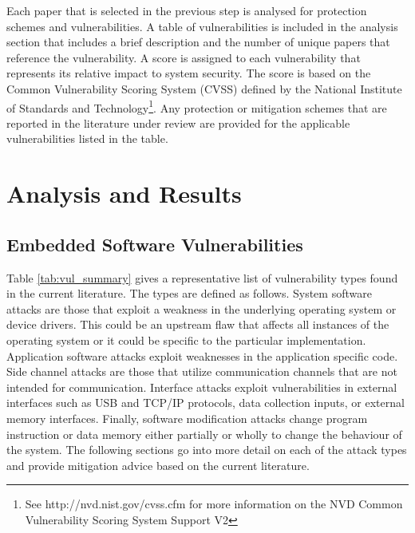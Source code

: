 \documentclass[final,conference,11pt]{IEEEtran}
\begin{document}
Each paper that is selected in the previous step is analysed for protection schemes and vulnerabilities.  A table of vulnerabilities is included in the analysis section that includes a brief description and the number of unique papers that reference the vulnerability. A score is assigned to each vulnerability that represents its relative impact to system security. The score is based on the Common Vulnerability Scoring System (CVSS) defined by the National Institute of Standards and Technology\footnote{See http://nvd.nist.gov/cvss.cfm for more information on the NVD Common Vulnerability Scoring System Support V2}.  Any protection or mitigation schemes that are reported in the literature under review are provided for the applicable vulnerabilities listed in the table.  

\section{Analysis and Results}

\subsection{Embedded Software Vulnerabilities}

Table \ref{tab:vul_summary} gives a representative list of vulnerability types found in the current literature.  The types are defined as follows.  System software attacks are those that exploit a weakness in the underlying operating system or device drivers.  This could be an upstream flaw that affects all instances of the operating system or it could be specific to the particular implementation. Application software attacks exploit weaknesses in the application specific code.  Side channel attacks are those that utilize communication channels that are not intended for communication.  Interface attacks exploit vulnerabilities in external interfaces such as USB and TCP/IP protocols, data collection inputs, or external memory interfaces.  Finally, software modification attacks change program instruction or data memory either partially or wholly to change the behaviour of the system.  The following sections go into more detail on each of the attack types and provide mitigation advice based on the current literature.
\end{document}
